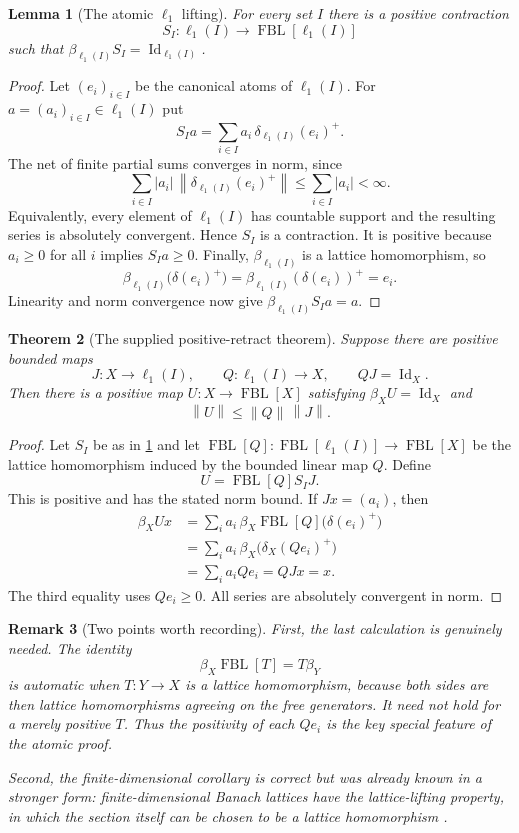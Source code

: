 \documentclass[11pt]{article}
\newtheorem{theorem}{Theorem}[section]
\newtheorem{lemma}[theorem]{Lemma}
\newtheorem{remark}[theorem]{Remark}
\newcommand{\FBL}{\operatorname{FBL}}
\newcommand{\Id}{\operatorname{Id}}
\newcommand{\norm}[1]{\left\lVert #1\right\rVert}
\begin{document}
\begin{lemma}[The atomic $\ell_1$ lifting]\label{lem:l1}
For every set $I$ there is a positive contraction
\[
 S_I:\ell_1(I)\longrightarrow \FBL[\ell_1(I)]
\]
such that $\beta_{\ell_1(I)}S_I=\Id_{\ell_1(I)}$.
\end{lemma}

\begin{proof}
Let $(e_i)_{i\in I}$ be the canonical atoms of $\ell_1(I)$.  For
$a=(a_i)_{i\in I}\in\ell_1(I)$ put
\[
 S_Ia=\sum_{i\in I}a_i\,\delta_{\ell_1(I)}(e_i)^+.
\]
The net of finite partial sums converges in norm, since
\[
 \sum_{i\in I}|a_i|\,
 \norm{\delta_{\ell_1(I)}(e_i)^+}
 \leq \sum_{i\in I}|a_i|<\infty.
\]
Equivalently, every element of $\ell_1(I)$ has countable support and the
resulting series is absolutely convergent.  Hence $S_I$ is a contraction.  It
is positive because $a_i\geq0$ for all $i$ implies $S_Ia\geq0$.  Finally,
$\beta_{\ell_1(I)}$ is a lattice homomorphism, so
\[
 \beta_{\ell_1(I)}\bigl(\delta(e_i)^+\bigr)
 =\beta_{\ell_1(I)}(\delta(e_i))^+=e_i.
\]
Linearity and norm convergence now give
$\beta_{\ell_1(I)}S_Ia=a$.
\end{proof}

\begin{theorem}[The supplied positive-retract theorem]\label{thm:retract}
Suppose there are positive bounded maps
\[
 J:X\longrightarrow\ell_1(I),
 \qquad Q:\ell_1(I)\longrightarrow X,
 \qquad QJ=\Id_X.
\]
Then there is a positive map $U:X\to\FBL[X]$ satisfying
$\beta_XU=\Id_X$ and
\[
 \norm U\leq \norm Q\,\norm J.
\]
\end{theorem}

\begin{proof}
Let $S_I$ be as in \cref{lem:l1} and let
$\FBL[Q]:\FBL[\ell_1(I)]\to\FBL[X]$ be the lattice homomorphism induced by
the bounded linear map $Q$.  Define
\[
 U=\FBL[Q]S_IJ.
\]
This is positive and has the stated norm bound.  If $Jx=(a_i)$, then
\begin{align*}
 \beta_XUx
 &=\sum_i a_i\,\beta_X\FBL[Q]\bigl(\delta(e_i)^+\bigr)\\
 &=\sum_i a_i\,\beta_X\bigl(\delta_X(Qe_i)^+\bigr)\\
 &=\sum_i a_i Qe_i
 =QJx=x.
\end{align*}
The third equality uses $Qe_i\geq0$.  All series are absolutely convergent in
norm.
\end{proof}

\begin{remark}[Two points worth recording]\label{rem:functoriality}
First, the last calculation is genuinely needed.  The identity
\[
 \beta_X\FBL[T]=T\beta_Y
\]
is automatic when $T:Y\to X$ is a lattice homomorphism, because both sides
are then lattice homomorphisms agreeing on the free generators.  It need not
hold for a merely positive $T$.  Thus the positivity of each $Qe_i$ is the key
special feature of the atomic proof.

Second, the finite-dimensional corollary is correct but was already known in
a stronger form: finite-dimensional Banach lattices have the lattice-lifting
property, in which the section itself can be chosen to be a lattice
homomorphism \cite[Proposition~2.2]{AvilesEtAl2022}.
\end{remark}
\end{document}
